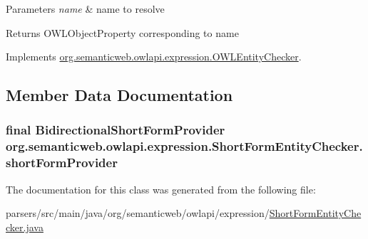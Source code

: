 \begin{DoxyParams}{Parameters}
{\em name} & name to resolve \\
\hline
\end{DoxyParams}
\begin{DoxyReturn}{Returns}
O\-W\-L\-Object\-Property corresponding to name 
\end{DoxyReturn}


Implements \hyperlink{interfaceorg_1_1semanticweb_1_1owlapi_1_1expression_1_1_o_w_l_entity_checker_a881fd858a1cf520ee79b549c119e868e}{org.\-semanticweb.\-owlapi.\-expression.\-O\-W\-L\-Entity\-Checker}.



\subsection{Member Data Documentation}
\hypertarget{classorg_1_1semanticweb_1_1owlapi_1_1expression_1_1_short_form_entity_checker_a98bf6a7bec1e62074cbb1eff7746771b}{
\subsubsection[{short\-Form\-Provider}]{\setlength{\rightskip}{0pt plus 5cm}final {\bf Bidirectional\-Short\-Form\-Provider} org.\-semanticweb.\-owlapi.\-expression.\-Short\-Form\-Entity\-Checker.\-short\-Form\-Provider\hspace{0.3cm}{\ttfamily [private]}}}\label{classorg_1_1semanticweb_1_1owlapi_1_1expression_1_1_short_form_entity_checker_a98bf6a7bec1e62074cbb1eff7746771b}


The documentation for this class was generated from the following file\-:\begin{DoxyCompactItemize}
\item 
parsers/src/main/java/org/semanticweb/owlapi/expression/\hyperlink{_short_form_entity_checker_8java}{Short\-Form\-Entity\-Checker.\-java}\end{DoxyCompactItemize}
